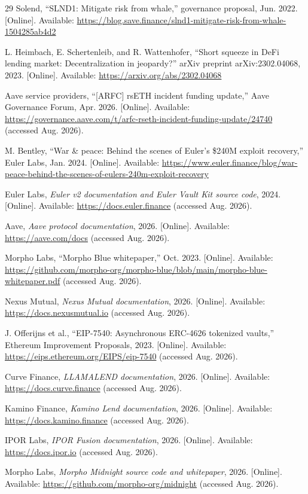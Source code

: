 \documentclass[11pt,a4paper]{article}
\begin{document}
\begin{thebibliography}{29}
 Solend, ``SLND1: Mitigate risk from whale,'' governance proposal, Jun. 2022. [Online]. Available: \url{https://blog.save.finance/slnd1-mitigate-risk-from-whale-1504285ab4d2}

 L. Heimbach, E. Schertenleib, and R. Wattenhofer, ``Short squeeze in DeFi lending market: Decentralization in jeopardy?'' arXiv preprint arXiv:2302.04068, 2023. [Online]. Available: \url{https://arxiv.org/abs/2302.04068}

 Aave service providers, ``[ARFC] rsETH incident funding update,'' Aave Governance Forum, Apr. 2026. [Online]. Available: \url{https://governance.aave.com/t/arfc-rseth-incident-funding-update/24740} (accessed Aug. 2026).

 M. Bentley, ``War \& peace: Behind the scenes of Euler's \$240M exploit recovery,'' Euler Labs, Jan. 2024. [Online]. Available: \url{https://www.euler.finance/blog/war-peace-behind-the-scenes-of-eulers-240m-exploit-recovery}

 Euler Labs, \emph{Euler v2 documentation and Euler Vault Kit source code}, 2024. [Online]. Available: \url{https://docs.euler.finance} (accessed Aug. 2026).

 Aave, \emph{Aave protocol documentation}, 2026. [Online]. Available: \url{https://aave.com/docs} (accessed Aug. 2026).

 Morpho Labs, ``Morpho Blue whitepaper,'' Oct. 2023. [Online]. Available: \url{https://github.com/morpho-org/morpho-blue/blob/main/morpho-blue-whitepaper.pdf} (accessed Aug. 2026).

 Nexus Mutual, \emph{Nexus Mutual documentation}, 2026. [Online]. Available: \url{https://docs.nexusmutual.io} (accessed Aug. 2026).

 J. Offerijns et al., ``EIP-7540: Asynchronous ERC-4626 tokenized vaults,'' Ethereum Improvement Proposals, 2023. [Online]. Available: \url{https://eips.ethereum.org/EIPS/eip-7540} (accessed Aug. 2026).

 Curve Finance, \emph{LLAMALEND documentation}, 2026. [Online]. Available: \url{https://docs.curve.finance} (accessed Aug. 2026).

 Kamino Finance, \emph{Kamino Lend documentation}, 2026. [Online]. Available: \url{https://docs.kamino.finance} (accessed Aug. 2026).

 IPOR Labs, \emph{IPOR Fusion documentation}, 2026. [Online]. Available: \url{https://docs.ipor.io} (accessed Aug. 2026).

 Morpho Labs, \emph{Morpho Midnight source code and whitepaper}, 2026. [Online]. Available: \url{https://github.com/morpho-org/midnight} (accessed Aug. 2026).

\end{thebibliography}
\end{document}
